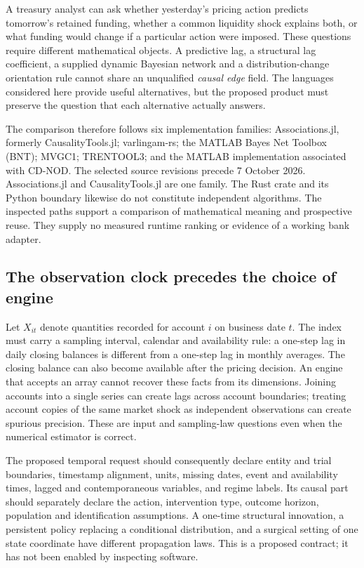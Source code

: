 A treasury analyst can ask whether yesterday's pricing action predicts
tomorrow's retained funding, whether a common liquidity shock explains both,
or what funding would change if a particular action were imposed. These
questions require different mathematical objects. A predictive lag, a
structural lag coefficient, a supplied dynamic Bayesian network and a
distribution-change orientation rule cannot share an unqualified
\emph{causal edge} field. The languages considered here provide useful
alternatives, but the proposed product must preserve the question that each
alternative actually answers.

The comparison therefore follows six implementation families:
Associations.jl, formerly CausalityTools.jl; varlingam-rs; the MATLAB Bayes
Net Toolbox (BNT); MVGC1; TRENTOOL3; and the MATLAB implementation associated
with CD-NOD. The selected source revisions precede 7 October 2026.
Associations.jl and CausalityTools.jl are one family. The Rust crate and its
Python boundary likewise do not constitute independent algorithms.
The inspected paths support a comparison of mathematical meaning and
prospective reuse. They supply no measured runtime ranking or evidence of a
working bank adapter.
\citep{exec17_temporal_associations,exec17_temporal_varlingam,
exec17_temporal_bnt,exec17_temporal_mvgc,exec17_temporal_trentool,
exec17_temporal_cdnod}

\subsection{The observation clock precedes the choice of engine}

Let $X_{it}$ denote quantities recorded for account $i$ on business date $t$.
The index must carry a sampling interval, calendar and availability rule:
a one-step lag in daily closing balances is different from a one-step lag in
monthly averages. The closing balance can also become available after the
pricing decision. An engine that accepts an array cannot recover these facts
from its dimensions. Joining accounts into a single series can create lags
across account boundaries; treating account copies of the same market shock
as independent observations can create spurious precision. These are input
and sampling-law questions even when the numerical estimator is correct.

The proposed temporal request should consequently declare entity and trial
boundaries, timestamp alignment, units, missing dates, event and availability
times, lagged and contemporaneous variables, and regime labels. Its causal
part should separately declare the action, intervention type, outcome horizon,
population and identification assumptions. A one-time structural innovation,
a persistent policy replacing a conditional distribution, and a surgical
setting of one state coordinate have different propagation laws.
This is a proposed contract; it has not been enabled by inspecting software.
\citep{exec17_temporal_contract}

